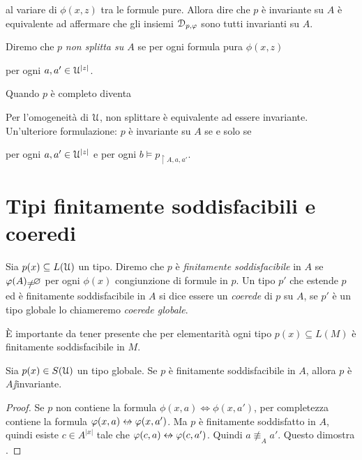 
al variare di $\phi(x,z)$ tra le formule pure. Allora dire che $p$ \`e invariante su $A$ \`e equivalente ad affermare che gli insiemi $\EuScript D_{p,\varphi}$ sono tutti invarianti su $A$. 

Diremo che $p$ \emph{non splitta su $A$\/} se per ogni formula pura  $\phi(x,z)$

\hfill per ogni $a,a'\in\EuScript U^{|z|}$.

Quando $p$ \`e completo  diventa


Per l'omogeneit\`a  di $\EuScript U$, non splittare \`e equivalente ad essere invariante. Un'ulteriore formulazione: $p$ \`e invariante su $A$ se e solo se

\hfill per ogni $a,a'\in\EuScript U^{|z|}$ e per ogni $b\models p_{\restriction A,a,a'}$. 

\section{Tipi finitamente soddisfacibili e coeredi}

Sia $p(x)\subseteq L(\EuScript U)$ un tipo. Diremo che $p$ \`e \emph{finitamente soddisfacibile\/} in $A$ se $\phi(A)\neq\0$ per ogni $\phi(x)$ congiunzione di formule in $p$. Un tipo $p'$ che estende $p$ ed \`e finitamente soddisfacibile in $A$ si dice essere un \emph{coerede\/} di $p$ su $A$, se $p'$ \`e un tipo globale lo chiameremo \emph{coerede globale}.

\`E importante da tener presente che per elementarit\`a ogni tipo $p(x)\subseteq L(M)$ \`e finitamente soddisfacibile in $M$.

\begin{proposition}\label{prop_coeredi_invarienti}
Sia $p(x)\in S(\EuScript U)$ un tipo globale. Se $p$ \`e finitamente soddisfacibile in $A$, allora $p$ \`e $A\jj$invariante.
\end{proposition}

\begin{proof}
Se $p$ non contiene la formula $\phi(x,a)\iff\phi(x,a')$, per completezza contiene la formula $\phi(x,a)\niff\phi(x,a')$. Ma $p$ \`e finitamente soddisfatto in $A$, quindi esiste $c\in A^{|x|}$ tale che $\phi(c,a)\niff\phi(c,a')$. Quindi $a\nequiv_Aa'$. Questo dimostra .
\end{proof}

